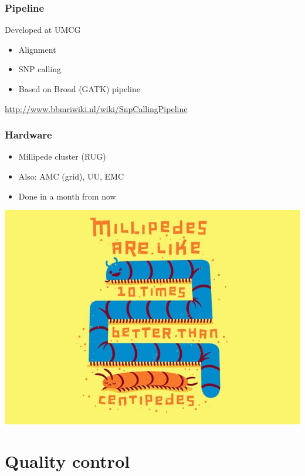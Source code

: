 \documentclass[slidestop,14pt]{beamer}
\begin{document}
\begin{frame}
  \frametitle{Pipeline}

  \vspace{\baselineskip}

  Developed at UMCG

  \vspace{\baselineskip}

  \begin{itemize}
    \item Alignment
    \item SNP calling
    \item Based on Broad (GATK) pipeline
  \end{itemize}

  \vspace{\baselineskip}

  \url{http://www.bbmriwiki.nl/wiki/SnpCallingPipeline}
\end{frame}

\begin{frame}
  \frametitle{Hardware}

  \vspace{\baselineskip}

  \begin{itemize}
    \item Millipede cluster (RUG)
    \item Also: AMC (grid), UU, EMC
    \item Done in a month from now
  \end{itemize}


  \vspace{0.5\baselineskip}

  \begin{center}
    \includegraphics[width=0.45\linewidth,transparent]{millipedes.jpg}
  \end{center}
\end{frame}

\section{Quality control}
\end{document}
